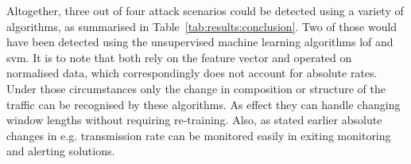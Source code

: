 \begin{comment}
\begin{itemize}
	\item 3 out of 4 attacks were successfully detected
	\item 2 of those by machine learning algorithms
	\item to note, that lof and svm were trained with normalised data
		\subitem traffic rates not into account
		\subitem only change in composition/structure can be recognised
		\subitem changes in transmission rate should be monitored in Grafana
		
	\item \gls{svm} is the best performing algo
		\subitem low background noise
		\subitem detected both direct attacks
		\subitem sharp decision surface
		\subitem small model, quick detection/estimation
		\subitem model training is computational intensive
				
	\item \gls{lof} does not perform well
		\subitem requires at least further tuning
		\subitem high background noise (cf. Figure~\ref{fig:results:validation:outlier})
		\subitem detected only \gls{dos} reliably
		\subitem almost detected scan, but was not clear distinguishable from background noise
		\subitem large model, longer computation time for detection
		\subitem nearest neighbour search is perform every time -> computational heavy, especially for large datasets
		
	\item addr analyser
		\subitem simple method to any drastic change involving unknown addresses in the network
		\subitem good supplement
		\subitem low resource overhead: small model, quick detection, fast training
	
	\item entropy was useless
		\subitem mostly entropy of inf calculated
\end{itemize}
\end{comment}

Altogether, three out of four attack scenarios could be detected using a variety of algorithms, as summarised in Table~\ref{tab:results:conclusion}. Two of those would have been detected using the unsupervised machine learning algorithms \gls{lof} and \gls{svm}.
It is to note that both rely on the feature vector and operated on normalised data, which correspondingly does not account for absolute rates.
Under those circumstances only the change in composition or structure of the traffic can be recognised by these algorithms. As effect they can handle changing window lengths without requiring re-training.
Also, as stated earlier absolute changes in e.g. transmission rate can be monitored easily in exiting monitoring and alerting solutions.

